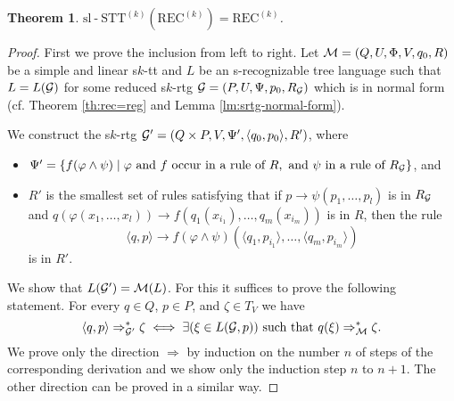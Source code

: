 \documentclass[10pt]{scrartcl}
\newtheorem{theo}[df]{Theorem}
\newcommand{\REC}{\mathrm{REC}}
\newcommand{\slSTT}{\mathrm{sl}\n\mathrm{STT}}
\newcommand{\M}{{\cal M}}
\newcommand{\G}{{\cal G}}
\DeclareMathOperator{\n}{-}
\def\ui#1{^{(#1)}}
\begin{document}
\begin{theo} \label{slin-theo}$\slSTT\ui k(\REC\ui k) = \REC\ui k$.
\end{theo}
\begin{proof} First we prove the inclusion from left to right. Let $\M = (Q,U,\Phi,V,q_0,R)$ be a simple and linear s$k$-tt and 
$L$ be an s-recognizable tree language such that $L=L(\G)$ for some reduced s$k$-rtg $\G=(P,U,\Psi,p_0,R_\G)$ which is
in normal form (cf. Theorem \ref{th:rec=reg} and Lemma \ref{lm:srtg-normal-form}).

We construct the s$k$-rtg $\G'=(Q\times P,V,\Psi',\langle q_0,p_0\rangle,R')$, where
\begin{itemize}
\item $\Psi'=\{ f(\varphi\wedge \psi) \mid \varphi \text{ and } f \text{ occur
 in a rule of } R, \text{ and } \psi \text{  in a rule of } R_\G \}$, and
\item $R'$ is the smallest set of rules satisfying that if $p \to \psi(p_1,\ldots,p_l)$ is in $R_\G$ and $q(\varphi(x_1,\ldots,x_l))\to f(q_1(x_{i_1}),\ldots,q_m(x_{i_m}))$ is in $R$, then 
the rule 
\begin{equation}
\langle q,p\rangle \to f(\varphi\wedge \psi)(\langle q_1,p_{i_1}\rangle,\ldots,\langle q_m,p_{i_m}\rangle)\label{rule}
\end{equation}
 is in $R'$.
\end{itemize} 
We show that $L(\G')=\M(L)$. For this it suffices
to prove the following statement. For every $q\in Q$, $p\in P$, and $\zeta \in T_V$ we have
\[ \langle q,p\rangle \Rightarrow_{\G'}^* \zeta \iff \exists (\xi \in L(\G,p)) \text{ such that } q(\xi) \Rightarrow_\M^* \zeta.\]
We prove only the direction $\Rightarrow$ by induction on the number $n$ of steps of the corresponding derivation and we show only the induction step $n$ to $n+1$. The other direction can be proved in a similar way.


\end{proof}
\end{document}
